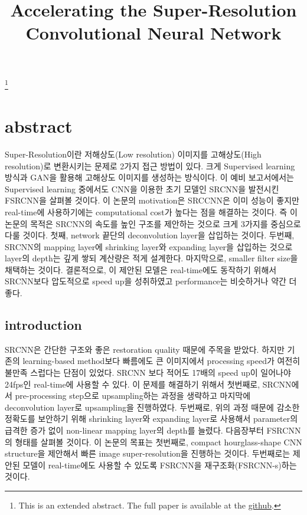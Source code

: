 \documentclass[extendedabs]{bmvc2k}
\begin{document}
\title{Accelerating the Super-Resolution Convolutional Neural Network}
\maketitle
\let\thefootnote\relax\footnote{This is an extended abstract. The full paper is available at the \href{https://github.com/LeeGwanHui/TIL/tree/main/deeplearning_ham}{github}. }
\vspace{-0.2in}

\section{abstract}

\quad Super-Resolution이란 저해상도(Low resolution) 이미지를 고해상도(High resolution)로 변환시키는 문제로 2가지 접근 방법이 있다.\cite{youtube}
크게 Supervised learning 방식과 GAN을 활용해 고해상도 이미지를 생성하는 방식이다. 이 예비 보고서에서는 Supervised learning 중에서도 CNN을 이용한 초기
모델인 SRCNN을 발전시킨 FSRCNN을 살펴볼 것이다. 
이 논문의 motivation은 SRCCNN은 이미 성능이 좋지만 real-time에 사용하기에는 computational cost가 높다는 점을 해결하는 것이다.
 즉 이 논문의 목적은 SRCNN의 속도를 높인 구조를 제안하는 것으로 크게 3가지를 중심으로 다룰 것이다. 
 첫째, network 끝단의 deconvolution layer을 삽입하는 것이다.
 두번째, SRCNN의 mapping layer에 shrinking layer와 expanding layer을 삽입하는 것으로 layer의 depth는 깊게 쌓되 계산량은 적게 설계한다.
 마지막으로, smaller filter size을 채택하는 것이다.
 결론적으로, 이 제안된 모델은 real-time에도 동작하기 위해서 SRCNN보다 압도적으로 speed up을 성취하였고 performance는 비슷하거나 약간 더 좋다.
 
 \subsection{introduction}
 \quad SRCNN은 간단한 구조와 좋은 restoration quality 때문에 주목을 받았다. 하지만 기존의 learning-based method보다 빠름에도 큰 이미지에서 processing speed가 
 여전히 불만족 스럽다는 단점이 있었다. SRCNN 보다 적어도 17배의 speed up이 일어나야 24fps인 real-time에 사용할 수 있다.
 이 문제를 해결하기 위해서 
 첫번째로, SRCNN에서 pre-processing step으로 upsampling하는 과정을 생략하고 마지막에 deconvolution layer로 upsampling을 진행하였다.
 두번째로, 위의 과정 때문에 감소한 정확도를 보안하기 위해 shrinking layer와 expanding layer로 사용해서 parameter의 
 급격한 증가 없이 non-linear mapping layer의 depth를 늘렸다. 다음장부터 FSRCNN의 형태를 살펴볼 것이다.
 이 논문의 목표는
 첫번째로, compact hourglass-shape CNN structure을 제안해서 빠른 image super-resolution을 진행하는 것이다.
 두번째로는 제안된 모델이 real-time에도 사용할 수 있도록 FSRCNN을 재구조화(FSRCNN-s)하는 것이다.
 
\end{document}

